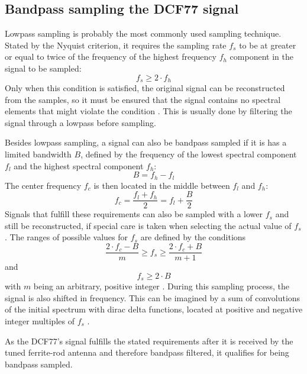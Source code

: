 \documentclass[conference]{IEEEtran}
\begin{document}
\subsection{Bandpass sampling the DCF77 signal}
Lowpass sampling is probably the most commonly used sampling technique.
Stated by the Nyquist criterion, it requires the sampling rate $f_{s}$ to be at greater or equal to twice of the frequency of the highest frequency $f_{h}$ component in the
signal to be sampled:
\begin{equation}
    f_{s} \geq 2 \cdot f_{h}
\end{equation}
Only when this condition is satisfied, the original signal can be reconstructed from the samples, so it must be ensured that the signal contains no spectral elements
that might violate the condition \cite{b6}.
This is usually done by filtering the signal through a lowpass before sampling.
\par
Besides lowpass sampling, a signal can also be bandpass sampled if it is has a limited bandwidth $B$, defined by the frequency of the lowest spectral component $f_{l}$ and
the highest spectral component $f_{h}$:
\begin{equation}
    B = f_{h} - f_{l}
\end{equation}
The center frequency $f_{c}$ is then located in the middle between $f_{l}$ and $f_{h}$:
\begin{equation}
    f_{c} = \frac{f_{l} + f_{h}}{2} = f_{l} + \frac{B}{2}
\end{equation}
Signals that fulfill these requirements can also be sampled with a lower $f_{s}$ and still be reconstructed, if special care is taken when selecting the actual value of $f_{s}$.
The ranges of possible values for $f_{s}$ are defined by the conditions
\begin{equation}
    \frac{2 \cdot f_{c} - B}{m} \geq f_{s} \geq \frac{2 \cdot f_{c} + B}{m + 1} \label{eqn:fs}
\end{equation}
and
\begin{equation}
    f_{s} \geq 2 \cdot B \label{eqn:fs_b}
\end{equation}
with $m$ being an arbitrary, positive integer \cite{b6}.
During this sampling process, the signal is also shifted in frequency. This can be imagined
by a sum of convolutions of the initial spectrum with dirac delta functions, located at
positive and negative integer multiples of $f_{s}$ \cite{b9}.
\par
As the DCF77's signal fulfills the stated requirements after it is received by the tuned ferrite-rod antenna and therefore bandpass filtered, it qualifies for being bandpass sampled.
\end{document}

